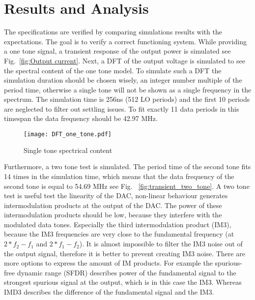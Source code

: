 \section{Results and Analysis}\label{sec:simulations}
The specifications are verified by comparing simulations results with the expectations. The goal is to verify a correct functioning system. While providing a one tone signal, a transient response of the output power is simulated see Fig.~\ref{fig:Output current}.
Next, a DFT of the output voltage is simulated to see the spectral content of the one tone model. To simulate such a DFT the simulation duration should be chosen wisely, an integer number multiple of the period time, otherwise a single tone will not be shown as a single frequency in the spectrum. The simulation time is 256ns (512 LO periods) and the first 10 periods are neglected to filter out settling issues. To fit exactly 11 data periods in this timespan the data frequency should be 42.97 MHz.
\begin{figure}[htp] 
\texttt{[image: DFT\_one\_tone.pdf]}
\caption{Single tone spectrical content}
\label{fig:transient_single_tone}
\end{figure}
Furthermore, a two tone test is simulated. The period time of the second tone fits 14 times in the simulation time, which means that the data frequency of the second tone is equal to 54.69 MHz see Fig. ~\ref{fig:transient_two_tone}. A two tone test is useful test the linearity of the DAC, non-linear behaviour generates intermodulation products at the output of the DAC. The power of these intermodulation products should be low, because they interfere with the modulated data tones. Especially the third intermodulation product (IM3), because the IM3 frequencies are very close to the fundamental frequency (at $2*f_2-f_1$ and $2*f_1-f_2$). It is almost impossible to filter the IM3 noise out of the output signal, therefore it is better to prevent creating IM3 noise. There are more options to express the amount of IM products. For example the spurious-free dynamic range (SFDR) describes power of the fundamental signal to the strongest spurious signal at the output, which is in this case the IM3. Whereas IMD3 describes the difference of the fundamental signal and the IM3.
